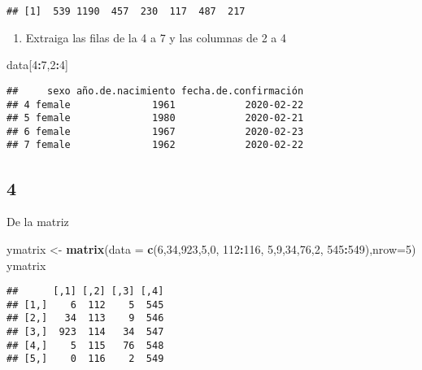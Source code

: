 \documentclass[]{article}
\newenvironment{Shaded}{\begin{snugshade}}{\end{snugshade}}
\newcommand{\KeywordTok}[1]{\textcolor[rgb]{0.13,0.29,0.53}{\textbf{#1}}}
\newcommand{\DataTypeTok}[1]{\textcolor[rgb]{0.13,0.29,0.53}{#1}}
\newcommand{\DecValTok}[1]{\textcolor[rgb]{0.00,0.00,0.81}{#1}}
\newcommand{\StringTok}[1]{\textcolor[rgb]{0.31,0.60,0.02}{#1}}
\newcommand{\OperatorTok}[1]{\textcolor[rgb]{0.81,0.36,0.00}{\textbf{#1}}}
\newcommand{\NormalTok}[1]{#1}
\providecommand{\tightlist}{%
  \setlength{\itemsep}{0pt}\setlength{\parskip}{0pt}}
\begin{document}
\begin{verbatim}
## [1]  539 1190  457  230  117  487  217
\end{verbatim}

\begin{enumerate}
\def\labelenumi{\alph{enumi}.}
\setcounter{enumi}{1}
\tightlist
\item
  Extraiga las filas de la 4 a 7 y las columnas de 2 a 4
\end{enumerate}

\begin{Shaded}
\begin{Highlighting}[]
\NormalTok{data[}\DecValTok{4}\OperatorTok{:}\DecValTok{7}\NormalTok{,}\DecValTok{2}\OperatorTok{:}\DecValTok{4}\NormalTok{]}
\end{Highlighting}
\end{Shaded}

\begin{verbatim}
##     sexo año.de.nacimiento fecha.de.confirmación
## 4 female              1961            2020-02-22
## 5 female              1980            2020-02-21
## 6 female              1967            2020-02-23
## 7 female              1962            2020-02-22
\end{verbatim}

\subsection{4}\label{section-3}

De la matriz

\begin{Shaded}
\begin{Highlighting}[]
\NormalTok{ymatrix <-}\StringTok{ }\KeywordTok{matrix}\NormalTok{(}\DataTypeTok{data =} \KeywordTok{c}\NormalTok{(}\DecValTok{6}\NormalTok{,}\DecValTok{34}\NormalTok{,}\DecValTok{923}\NormalTok{,}\DecValTok{5}\NormalTok{,}\DecValTok{0}\NormalTok{, }\DecValTok{112}\OperatorTok{:}\DecValTok{116}\NormalTok{, }\DecValTok{5}\NormalTok{,}\DecValTok{9}\NormalTok{,}\DecValTok{34}\NormalTok{,}\DecValTok{76}\NormalTok{,}\DecValTok{2}\NormalTok{, }\DecValTok{545}\OperatorTok{:}\DecValTok{549}\NormalTok{),}\DataTypeTok{nrow=}\DecValTok{5}\NormalTok{)}
\NormalTok{ymatrix}
\end{Highlighting}
\end{Shaded}

\begin{verbatim}
##      [,1] [,2] [,3] [,4]
## [1,]    6  112    5  545
## [2,]   34  113    9  546
## [3,]  923  114   34  547
## [4,]    5  115   76  548
## [5,]    0  116    2  549
\end{verbatim}
\end{document}
